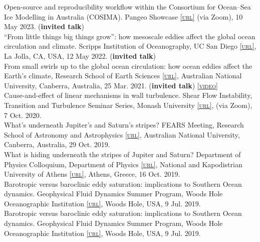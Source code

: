 \documentclass[10pt, letter]{article}
\def\www{http://www.navidconstantinou.com}
\newcommand{\html}[1]{\href{#1}{\scriptsize\textsc{[url]}}}
\newcommand{\years}[1]{\marginnote{\scriptsize #1}}
\begin{document}
\years{2023} Open-source and reproducibility workflow within the Consortium for Ocean--Sea Ice Modelling in Australia (COSIMA). Pangeo Showcase \html{https://pangeo.io/pangeo-showcase.html} (via Zoom), 10 May 2023. (\textbf{invited talk}) \\[.2cm]
\years{2022} “From little things big things grow”: how mesoscale eddies affect the global ocean circulation and climate. Scripps Institution of Oceanography, UC San Diego \html{https://scripps.ucsd.edu/}, La Jolla, CA, USA, 12 May 2022. (\textbf{invited talk}) \\[.2cm]
\years{2021} From small swirls up to the global ocean circulation: how ocean eddies affect the Earth’s climate, Research School of Earth Sciences \html{https://earthsciences.anu.edu.au/}, Australian National University, Canberra, Australia, 25 Mar. 2021. (\textbf{invited talk}) \href{\www/presentations/RSES-EddiesClimate_Mar2021.pdf}{{}} \href{https://www.youtube.com/watch?v=PPz8bD-vJmI&list=PLyZME1ti5Gk3RzPpheCQmtA7XUlqNT7LY&index=25}{\scriptsize\textsc{[video]}}\\[.2cm]
\years{2020} Cause-and-effect of linear mechanisms in wall turbulence. Shear Flow Instability, Transition and Turbulence Seminar Series, Monash University \html{https://www.monash.edu}, (via Zoom), 7 Oct. 2020.  \href{\www/presentations/Monash-ShearTurbulence-Oct2020.pdf}{{}}\\[.2cm]
What's underneath Jupiter's and Saturn's stripes? FEARS Meeting, Research School of Astronomy and Astrophysics \html{http://rsaa.anu.edu.au/}, Australian National University, Canberra, Australia, 29 Oct. 2019. \href{\www/presentations/RSAA-MagneticViscosity_Oct2019.pdf}{{}}\\[.2cm]
What is hiding underneath the stripes of Jupiter and Saturn? Department of Physics Colloquium, Department of Physics \html{http://en.phys.uoa.gr/}, National and Kapodistrian University of Athens \html{http://en.uoa.gr/}, Athens, Greece, 16 Oct. 2019. \href{\www/presentations/UoA-MagneticViscosity_Oct2019.pdf}{{}}\\[.2cm]
Barotropic versus baroclinic eddy saturation: implications to Southern Ocean dynamics. Geophysical Fluid Dynamics Summer Program, Woods Hole Oceanographic Institution \html{https://www.whoi.edu/gfd}, Woods Hole, USA, 9 Jul. 2019. \href{\www/presentations/EddySaturation-GFD-2019.pdf}{{}}\\[.2cm]
Barotropic versus baroclinic eddy saturation: implications to Southern Ocean dynamics. Geophysical Fluid Dynamics Summer Program, Woods Hole Oceanographic Institution \html{https://www.whoi.edu/gfd}, Woods Hole, USA, 9 Jul. 2019. \href{\www/presentations/EddySaturation-GFD-2019.pdf}{{}}\\[.2cm]
\end{document}
